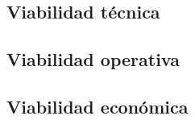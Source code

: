 
\subsection{Viabilidad técnica}


\subsection{Viabilidad operativa}



\subsection{Viabilidad económica}


